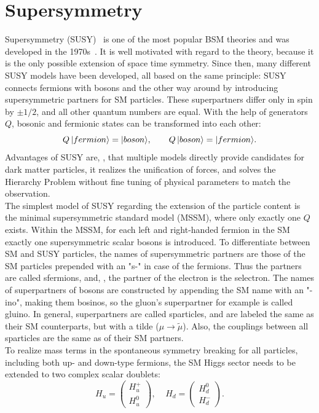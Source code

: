 \section{Supersymmetry}\label{sec:SUSY}
Supersymmetry (SUSY)~\cite{SUSYOriginal,SUSYPrimer} is one of the most popular BSM theories and was developed in the 1970s~\cite{SUSYTheorem,HAAG1975257}. It is well motivated with regard to the theory, because it is the only possible extension of space time symmetry. Since then, many different SUSY models have been developed, all based on the same principle: SUSY connects fermions with bosons and the other way around by introducing supersymmetric partners for SM particles. These superpartners differ only in spin by $\pm1/2$, and all other quantum numbers are equal. With the help of generators $Q$, bosonic and fermionic states can be transformed into each other:
\begin{equation}
 Q\,\lvert fermion\rangle=\lvert boson\rangle,~~~~~~ Q\,\lvert boson\rangle=\lvert fermion\rangle.
\end{equation}
Advantages of SUSY are, \eg, that multiple models directly provide candidates for dark matter particles, it realizes the unification of forces, and solves the Hierarchy Problem without fine tuning of physical parameters to match the observation.\\
The simplest model of SUSY regarding the extension of the particle content is the minimal supersymmetric standard model (MSSM), where only exactly one $Q$ exists. Within the MSSM, for each left and right-handed fermion in the SM exactly one supersymmetric scalar bosons is introduced. To differentiate between SM and SUSY particles, the names of supersymmetric partners are those of the SM particles prepended with an "s-" in case of the fermions. Thus the partners are called sfermions, and, \eg, the partner of the electron is the selectron. The names of superpartners of bosons are constructed by appending the SM name with an "-ino", making them bosinos, so the gluon's superpartner for example is called gluino. In general, superpartners are called sparticles, and are labeled the same as their SM counterparts, but with a tilde (\eg $\mu \to \widetilde{\mu}$). Also, the couplings between all sparticles are the same as of their SM partners.\\
To realize mass terms in the spontaneous symmetry breaking for all particles, including both up- and down-type fermions, the SM Higgs sector needs to be extended to two complex scalar doublets:
\begin{equation}
 H_u=  \left(
 \begin{matrix}
  H_u^+ \\
  H_u^0
 \end{matrix}
 \right),~~~~~
 H_d=  \left(
 \begin{matrix}
  H_d^0 \\
  H_d^-
 \end{matrix}
 \right).
\end{equation}
